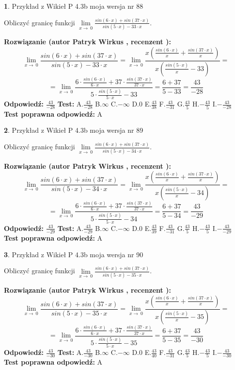 \documentclass[12pt, a4paper]{article}
\theoremstyle{definition} %
\newtheorem{zad}{}
\newcommand{\zadStart}[1]{\begin{zad}#1\newline}
\newcommand{\zadStop}{\end{zad}}
\newcommand{\rozwStart}[2]{\noindent \textbf{Rozwiązanie (autor #1 , recenzent #2): }\newline}
\newcommand{\rozwStop}{\newline}
\newcommand{\odpStart}{\noindent \textbf{Odpowiedź:}\newline}
\newcommand{\odpStop}{\newline}
\newcommand{\testStart}{\noindent \textbf{Test:}\newline}
\newcommand{\testStop}{\newline}
\newcommand{\kluczStart}{\noindent \textbf{Test poprawna odpowiedź:}\newline}
\newcommand{\kluczStop}{\newline}
\begin{document}
\zadStart{Przykład z Wikieł P 4.3b moja wersja nr 88}


Obliczyć granicę funkcji $\lim\limits_{x\to\ 0}\frac{sin(6 \cdot x)+sin(37 \cdot x)}{sin(5 \cdot x)-33 \cdot x}$.
\zadStop
\rozwStart{Patryk Wirkus}{}
$$\lim\limits_{x\to\ 0}\frac{sin(6 \cdot x)+sin(37 \cdot x)}{sin(5 \cdot x)-33 \cdot x}=\lim\limits_{x\to\ 0}\frac{x(\frac{sin(6 \cdot x)}{x}+\frac{sin(37 \cdot x)}{x})}{x(\frac{sin(5 \cdot x)}{x}-33)}=$$
$$=\lim\limits_{x\to\ 0}\frac{6 \cdot \frac{sin(6 \cdot x)}{6 \cdot x}+37 \cdot \frac{sin(37 \cdot x)}{37 \cdot x}}{5 \cdot \frac{sin(5 \cdot x)}{5 \cdot x}-33}=\frac{6+37}{5-33} = \frac{43}{-28}$$
\rozwStop
\odpStart
$\frac{43}{-28}$
\odpStop
\testStart
A.$\frac{43}{-28}$
B.$\infty$
C.$-\infty$
D.$0$
E.$\frac{43}{38}$
F.$\frac{43}{-31}$
G.$\frac{43}{5}$
H.$-\frac{43}{5}$
I.$-\frac{43}{-28}$
\testStop
\kluczStart
A
\kluczStop



\zadStart{Przykład z Wikieł P 4.3b moja wersja nr 89}


Obliczyć granicę funkcji $\lim\limits_{x\to\ 0}\frac{sin(6 \cdot x)+sin(37 \cdot x)}{sin(5 \cdot x)-34 \cdot x}$.
\zadStop
\rozwStart{Patryk Wirkus}{}
$$\lim\limits_{x\to\ 0}\frac{sin(6 \cdot x)+sin(37 \cdot x)}{sin(5 \cdot x)-34 \cdot x}=\lim\limits_{x\to\ 0}\frac{x(\frac{sin(6 \cdot x)}{x}+\frac{sin(37 \cdot x)}{x})}{x(\frac{sin(5 \cdot x)}{x}-34)}=$$
$$=\lim\limits_{x\to\ 0}\frac{6 \cdot \frac{sin(6 \cdot x)}{6 \cdot x}+37 \cdot \frac{sin(37 \cdot x)}{37 \cdot x}}{5 \cdot \frac{sin(5 \cdot x)}{5 \cdot x}-34}=\frac{6+37}{5-34} = \frac{43}{-29}$$
\rozwStop
\odpStart
$\frac{43}{-29}$
\odpStop
\testStart
A.$\frac{43}{-29}$
B.$\infty$
C.$-\infty$
D.$0$
E.$\frac{43}{39}$
F.$\frac{43}{-31}$
G.$\frac{43}{5}$
H.$-\frac{43}{5}$
I.$-\frac{43}{-29}$
\testStop
\kluczStart
A
\kluczStop



\zadStart{Przykład z Wikieł P 4.3b moja wersja nr 90}


Obliczyć granicę funkcji $\lim\limits_{x\to\ 0}\frac{sin(6 \cdot x)+sin(37 \cdot x)}{sin(5 \cdot x)-35 \cdot x}$.
\zadStop
\rozwStart{Patryk Wirkus}{}
$$\lim\limits_{x\to\ 0}\frac{sin(6 \cdot x)+sin(37 \cdot x)}{sin(5 \cdot x)-35 \cdot x}=\lim\limits_{x\to\ 0}\frac{x(\frac{sin(6 \cdot x)}{x}+\frac{sin(37 \cdot x)}{x})}{x(\frac{sin(5 \cdot x)}{x}-35)}=$$
$$=\lim\limits_{x\to\ 0}\frac{6 \cdot \frac{sin(6 \cdot x)}{6 \cdot x}+37 \cdot \frac{sin(37 \cdot x)}{37 \cdot x}}{5 \cdot \frac{sin(5 \cdot x)}{5 \cdot x}-35}=\frac{6+37}{5-35} = \frac{43}{-30}$$
\rozwStop
\odpStart
$\frac{43}{-30}$
\odpStop
\testStart
A.$\frac{43}{-30}$
B.$\infty$
C.$-\infty$
D.$0$
E.$\frac{43}{40}$
F.$\frac{43}{-31}$
G.$\frac{43}{5}$
H.$-\frac{43}{5}$
I.$-\frac{43}{-30}$
\testStop
\kluczStart
A
\kluczStop
\end{document}
